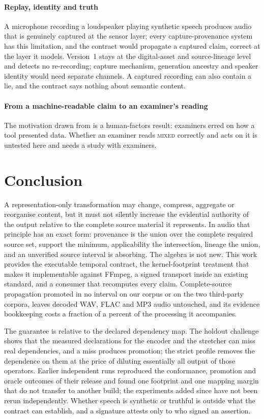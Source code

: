 \documentclass[preprint,3p,11pt,authoryear]{elsarticle}
\begin{document}
\paragraph{Replay, identity and truth} A microphone recording a loudspeaker
playing synthetic speech produces audio that is genuinely captured at the
sensor layer; every capture-provenance system has this limitation, and the
contract would propagate a captured claim, correct at the layer it models.
Version~1 stays at the digital-asset and source-lineage level and detects no
re-recording; capture mechanism, generation ancestry and speaker identity would
need separate channels. A captured recording can also contain a lie, and the
contract says nothing about semantic content.

\paragraph{From a machine-readable claim to an examiner's reading} The
motivation drawn from \citet{andersen2025toolbias} is a human-factors result:
examiners erred on how a tool presented data. Whether an examiner reads
\textsc{mixed} correctly and acts on it is untested here and needs a study with
examiners.

\section{Conclusion}
\label{sec:conclusion}

A representation-only transformation may change, compress, aggregate or
reorganise content, but it must not silently increase the evidential authority
of the output relative to the complete source material it represents. In audio
that principle has an exact form: provenance is the union over the complete
required source set, support the minimum, applicability the intersection,
lineage the union, and an unverified source interval is absorbing. The algebra
is not new. This work provides the executable temporal contract, the
kernel-footprint treatment that makes it implementable against FFmpeg, a signed
transport inside an existing standard, and a consumer that recomputes every claim.
Complete-source propagation promoted in no interval on our corpus or on the two
third-party corpora, leaves decoded WAV, FLAC and MP3 audio untouched, and its evidence bookkeeping
costs a fraction of a percent of the processing it accompanies.

The guarantee is relative to the declared dependency map. The holdout challenge
shows that the measured declarations for the encoder and the stretcher can miss
real dependencies, and a miss produces promotion; the strict profile removes the
dependence on them at the price of diluting essentially all output of those
operators. Earlier independent runs reproduced the conformance, promotion and
oracle outcomes of their release and found one footprint and one mapping margin
that do not transfer to another build; the experiments added since have not been
rerun independently. Whether speech is synthetic or truthful is outside what the
contract can establish, and a signature attests only to who signed an assertion.
\end{document}
